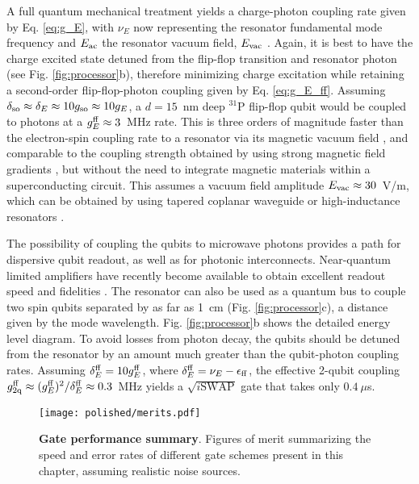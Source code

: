 A full quantum mechanical treatment yields a charge-photon coupling rate given by Eq. \ref{eq:g_E}, with $\nu_E$ now representing the resonator fundamental mode frequency and $E_{\rm ac}$ the resonator vacuum field, $E_{\rm vac}$ . Again, it is best to have the charge excited state detuned from the flip-flop transition and resonator photon (see Fig. \ref{fig:processor}b), therefore minimizing charge excitation while retaining a second-order flip-flop-photon coupling given by Eq. \ref{eq:g_E_ff}. Assuming $\delta_{\rm so}\approx\delta_E\approx 10g_{\rm so}\approx 10g_E$, a $d=15$~nm deep $^{31}$P flip-flop qubit would be coupled to photons at a $g^{\rm ff}_E\approx3$~MHz rate. This is three orders of magnitude faster than the electron-spin coupling rate to a resonator via its magnetic vacuum field \cite{Tosi2014,Haikka2017}, and comparable to the coupling strength obtained by using strong magnetic field gradients \cite{Hu2012,Viennot2015}, but without the need to integrate magnetic materials within a superconducting circuit. This assumes a vacuum field amplitude $E_{\rm vac}\approx 30$~V/m, which can be obtained by using tapered coplanar waveguide or high-inductance resonators \cite{Samkharadze2016}.

The possibility of coupling the qubits to microwave photons provides a path for dispersive qubit readout, as well as for photonic interconnects. Near-quantum limited amplifiers have recently become available to obtain excellent readout speed and fidelities \cite{Castellanos2008}. The resonator can also be used as a quantum bus to couple two spin qubits separated by as far as 1~cm (Fig. \ref{fig:processor}c), a distance given by the mode wavelength. Fig. \ref{fig:processor}b shows the detailed energy level diagram. To avoid losses from photon decay, the qubits should be detuned from the resonator by an amount much greater than the qubit-photon coupling rates. Assuming $\delta^{\rm ff}_E=10g_{E}^{\rm ff}$, where $\delta^{\rm ff}_E=\nu_E-\epsilon_{\rm ff}$, the effective 2-qubit coupling $g_{\rm 2q}^{\rm ff}\approx(g_E^{\rm ff})^2/\delta^{\rm ff}_E\approx 0.3$~MHz yields a $\sqrt{i\mathrm{SWAP}}$ gate that takes only $0.4~\mu$s.


\begin{figure}
	\centering
	\texttt{[image: polished/merits.pdf]}
	\caption[Gate performance summary summary]{\textbf{Gate performance summary}. Figures of merit summarizing the speed and error rates of different gate schemes present in this chapter, assuming realistic noise sources. }
	\label{fig:performance}
\end{figure}